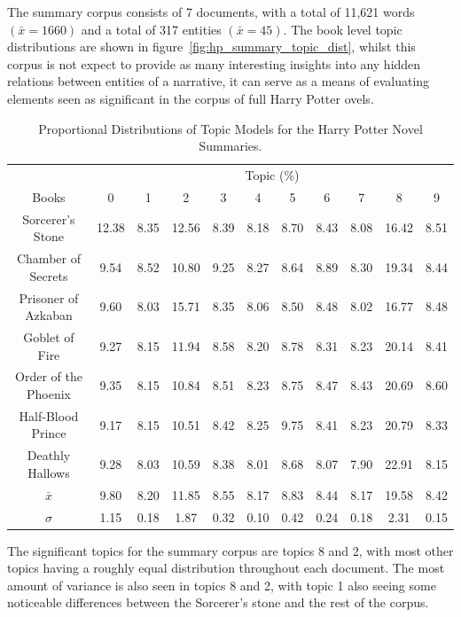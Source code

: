 \documentclass[10pt]{report}
\begin{document}
The summary corpus consists of 7 documents, with a total of 11,621 words $(\bar{x}=1660)$ and a total of 317 entities $(\bar{x}=45)$. The book level topic distributions are shown in figure~\ref{fig:hp_summary_topic_dist}, whilst this corpus is not expect to provide as many interesting insights into any hidden relations between entities of a narrative, it can serve as a means of evaluating elements seen as significant in the corpus of full Harry Potter ovels.

\renewcommand{\baselinestretch}{1.0}\normalsize
\renewcommand{\arraystretch}{1.0}
\begin{table}[h!]
  \begin{tabular}{c || c | c | c | c | c | c | c | c | c | c}
     & \multicolumn{10}{c}{Topic (\%)}\\
    Books&                      0&	    1&	    2&	    3&	    4&	    5&	    6&  	7&	    8&	  9\\
    \hline
    Sorcerer's Stone	    &12.38&	8.35&	12.56&	8.39&	8.18&	8.70&	8.43&	8.08&	16.42&	8.51\\
    Chamber of Secrets	    &9.54&	8.52&	10.80&	9.25&	8.27&	8.64&	8.89&	8.30&	19.34&	8.44\\
    Prisoner of Azkaban	    &9.60&	8.03&	15.71&	8.35&	8.06&	8.50&	8.48&	8.02&	16.77&	8.48\\
    Goblet of Fire	        &9.27&	8.15&	11.94&	8.58&	8.20&	8.78&	8.31&	8.23&	20.14&	8.41\\
    Order of the Phoenix	&9.35&	8.15&	10.84&	8.51&	8.23&	8.75&	8.47&	8.43&	20.69&	8.60\\
    Half-Blood Prince	    &9.17&	8.15&	10.51&	8.42&	8.25&	9.75&	8.41&	8.23&	20.79&	8.33\\
    Deathly Hallows	        &9.28&	8.03&	10.59&	8.38&	8.01&	8.68&	8.07&	7.90&	22.91&	8.15\\
    \hline
    $\bar{x}$	            &9.80&	8.20&	11.85&	8.55&	8.17&	8.83&	8.44&	8.17&	19.58&	8.42\\
    $\sigma$	            &1.15&	0.18&	1.87&	0.32&	0.10&	0.42&	0.24&	0.18&	2.31&	0.15                                                                                         
  \end{tabular}
  \caption{Proportional Distributions of Topic Models for the Harry Potter Novel Summaries.}
\end{table}
\renewcommand{\baselinestretch}{2.0}\normalsize
\renewcommand{\arraystretch}{1.0}
\clearpage
The significant topics for the summary corpus are topics 8 and 2, with most other topics having a roughly equal distribution throughout each document. The most amount of variance is also seen in topics 8 and 2, with topic 1 also seeing some noticeable differences between the Sorcerer's stone and the rest of the corpus.
\end{document}
